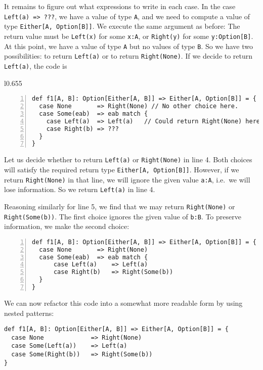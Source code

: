 \noindent It remains to figure out what expressions to write in each
case. In the case \lstinline!Left(a) => ???!, we have a value of
type \lstinline!A!, and we need to compute a value of type \lstinline!Either[A, Option[B]]!.
We execute the same argument as before: The return value must be \lstinline!Left(x)!
for some \lstinline!x:A!, or \lstinline!Right(y)! for some \lstinline!y:Option[B]!.
At this point, we have a value of type \lstinline!A! but no values
of type \lstinline!B!. So we have two possibilities: to return \lstinline!Left(a)!
or to return \lstinline!Right(None)!. If we decide to return \lstinline!Left(a)!,
the code is

\begin{wrapfigure}{l}{0.655\columnwidth}%
\vspace{-0.6\baselineskip}
\begin{lstlisting}[numbers=left]
def f1[A, B]: Option[Either[A, B]] => Either[A, Option[B]] = {
  case None       => Right(None) // No other choice here.
  case Some(eab)  => eab match {
    case Left(a)  => Left(a)   // Could return Right(None) here.
    case Right(b) => ???
  }
}
\end{lstlisting}

\vspace{-0.8\baselineskip}
\end{wrapfigure}%

\noindent Let us decide whether to return \lstinline!Left(a)! or
\lstinline!Right(None)! in line 4. Both choices will satisfy the
required return type \lstinline!Either[A, Option[B]]!. However, if
we return \lstinline!Right(None)! in that line, we will ignore the
given value \lstinline!a:A!, i.e.~we will lose information.
So we return \lstinline!Left(a)! in line 4.

Reasoning similarly for line 5, we find that we may return \lstinline!Right(None)!
or \lstinline!Right(Some(b))!. The first choice ignores the given
value of \lstinline!b:B!. To preserve information, we make the second
choice:
\begin{lstlisting}[numbers=left]
def f1[A, B]: Option[Either[A, B]] => Either[A, Option[B]] = {
  case None       => Right(None)
  case Some(eab)  => eab match {
      case Left(a)    => Left(a)
      case Right(b)   => Right(Some(b))
  }
}
\end{lstlisting}

We can now refactor this code into a somewhat more readable form by
using nested patterns: 
\begin{lstlisting}
def f1[A, B]: Option[Either[A, B]] => Either[A, Option[B]] = {
  case None             => Right(None)
  case Some(Left(a))    => Left(a)
  case Some(Right(b))   => Right(Some(b))
}
\end{lstlisting}


